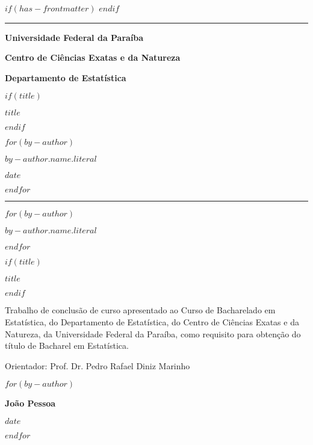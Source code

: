 $if(has-frontmatter)$
\scrreprt
$endif$
\cleardoublepage
\thispagestyle{empty}
{\centering
\noindent\rule{\textwidth}{0.5pt}

\vspace{2ex}

{\Large\bfseries Universidade Federal da Paraíba \par}
\vspace{1ex}
{\Large\bfseries Centro de Ciências Exatas e da Natureza \par}
\vspace{1ex}
{\Large\bfseries Departamento de Estatística \par}

\vfill

$if(title)$
{\large\bfseries $title$ \par}
$endif$

\vfill

$for(by-author)$
{\large $by-author.name.literal$ \par}
\vfill
{\normalsize $date$ \par}
$endfor$


\noindent\rule{\textwidth}{0.5pt}

\newpage

$for(by-author)$
{\normalsize\bfseries $by-author.name.literal$ \par}
$endfor$

\vfill

$if(title)$
{\large\bfseries $title$ \par}
$endif$

\vfill

\hfill \parbox{8cm}{\normalsize{Trabalho de conclusão de curso apresentado ao Curso de Bacharelado em Estatística, do Departamento de Estatística, do Centro de Ciências Exatas e da Natureza, da Universidade Federal da Paraíba, como requisito para obtenção do título de Bacharel em Estatística.}}

\vfill

{\normalsize Orientador: Prof. Dr. Pedro Rafael Diniz Marinho}

\vfill

$for(by-author)$
{\normalsize\bfseries João Pessoa \par}
{\normalsize\bfseries $date$ \par}
$endfor$

}
